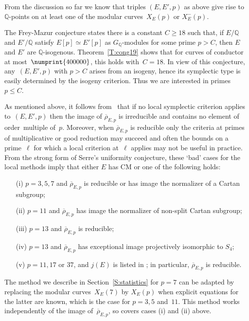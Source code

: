 \documentclass[12pt]{amsart}
\newcommand{\Q}{\mathbb{Q}}
\newcommand{\rhobar}{{\overline{\rho}}}
\numberwithin{equation}{section}
\theoremstyle{definition}
\theoremstyle{remark}
\begin{document}
From the discussion so far we know that triples $(E,E',p)$ as above give rise to $\Q$-points on at least one of the modular curves~$X_E(p)$ or $X_E^-(p)$. 

The Frey-Mazur conjecture states there is a constant $C \geq 18$ such
that, if $E/\Q$ and $E'/\Q$ satisfy $E[p] \simeq E'[p]$ as
$G_\Q$-modules for some prime $p > C$, then $E$ and $E'$ are
$\Q$-isogenous. Theorem~\ref{T:cong19} shows that for curves of
conductor at most~$\numprint{400000}$, this holds with~$C=18$. In view
of this conjecture, any~$(E,E',p)$ with $p > C$ arises from an
isogeny, hence its symplectic type is easily determined by the isogeny
criterion. Thus we are interested in primes $p \leq C$.


As mentioned above, it follows from~\cite{FKSym} 
that if no local symplectic criterion
applies to~$(E,E',p)$ then the image of $\rhobar_{E,p}$ is irreducible and contains no element of order~multiple of~$p$. Moreover, 
when $\rhobar_{E,p}$ is reducible only the criteria at primes of multiplicative or good reduction may succeed and often the bounds
on a prime~$\ell$ for which a local criterion at~$\ell$ 
applies may not be useful in practice.
From the strong form of Serre's uniformity conjecture, these `bad' cases for the local methods imply that either $E$ has CM 
or one of the following holds:
\begin{itemize}
 \item[(i)] $p=3,5,7$ and $\rhobar_{E,p}$ is reducible or has image the normalizer of a Cartan subgroup;
 \item[(ii)] $p=11$ and $\rhobar_{E,p}$ has image the normalizer of non-split Cartan subgroup;
 \item[(iii)] $p=13$ and $\rhobar_{E,p}$ is reducible; 
 \item[(iv)] $p=13$ and $\rhobar_{E,p}$ has exceptional image projectively isomorphic to $S_4$;
 \item[(v)] $p=11,17$ or $37$, and $j(E)$ is listed
 in \cite[Table~2.1]{DahmenPhD}; in particular, $\rhobar_{E,p}$ is reducible.
\end{itemize}
The method we describe in Section~\ref{S:statistics} for $p=7$ can be
adapted by replacing the modular curves~$X_E(7)$ by $X_E(p)$ when
explicit equations for the latter are known, which is the case for
$p=3,5$ and~$11$. This method works independently of the image
of~$\rhobar_{E,p}$, so covers cases (i) and (ii) above.
\end{document}
